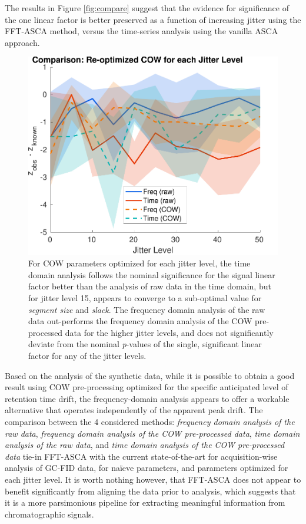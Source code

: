 \documentclass[preprint,12pt]{elsarticle}
\begin{document}
The results in Figure \ref{fig:compare} suggest that the evidence for significance of the one linear factor is better preserved as a function of increasing jitter using the FFT-ASCA method, versus the time-series analysis using the vanilla ASCA approach.

\begin{figure}[ht!]
    \centering
    \includegraphics[width=0.9
    \linewidth]{figures/comparison_cow_reoptimized.pdf}
    \caption{For COW parameters optimized for each jitter level, the time domain analysis follows the nominal significance for the signal linear factor better than the analysis of raw data in the time domain, but for jitter level 15, appears to converge to a sub-optimal value for \textit{segment size} and \textit{slack}. The frequency domain analysis of the raw data out-performs the frequency domain analysis of the COW pre-processed data for the higher jitter levels, and does not significantly deviate from the nominal \textit{p}-values of the single, significant linear factor for any of the jitter levels.}
    \label{fig:reopt_COW}
\end{figure}

Based on the analysis of the synthetic data, while it is possible to obtain a good result using COW pre-processing optimized for the specific anticipated level of retention time drift, the frequency-domain analysis appears to offer a workable alternative that operates independently of the apparent peak drift. The comparison between the 4 considered methods: \textit{frequency domain analysis of the raw data}, \textit{frequency domain analysis of the COW pre-processed data}, \textit{time domain analysis of the raw data}, and \textit{time domain analysis of the COW pre-processed data} tie-in FFT-ASCA with the current state-of-the-art for acquisition-wise analysis of GC-FID data, for na\"ieve parameters, and parameters optimized for each jitter level. It is worth nothing however, that FFT-ASCA does not appear to benefit significantly from aligning the data prior to analysis, which suggests that it is a more parsimonious pipeline for extracting meaningful information from chromatographic signals.
\end{document}
